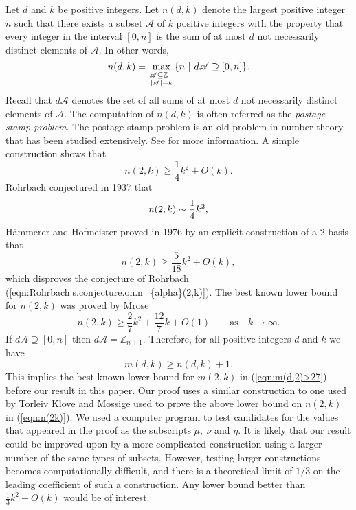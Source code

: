 \documentclass[11pt]{article}
\theoremstyle{definition}
\def\Z{\mbox{$\mathbb Z$}}
\begin{document}
 Let $d$ and $k$ be  positive integers. Let $n(d, k)$ denote the largest positive integer $n$ such that there exists a subset $\mathscr{A}$ of $k$ positive integers with the property that every integer in the interval $[0, n]$ is the sum of at most $d$ not necessarily distinct elements of $\mathscr{A}$. In other words, 
\[
n(d, k) = \max_{\scriptstyle \mathscr{A}\subseteq\mathbb Z^{+}\atop\scriptstyle |\mathscr{A}|=k}\{n\  |\ d \mathscr{A}\supseteq[0, n]\}.
\]
Recall that $d\mathscr A$ denotes the set of all sums of at most $d$ not necessarily distinct elements of $\mathscr A$. The computation of  $n(d, k)$ is often referred as the \emph{postage stamp problem}. The postage stamp problem is an old problem in number theory that has been studied extensively. See \cite{Hsu-Jia:CombinatorialNetworks,Selmer:1986a,Selmer:1986b} for more information. 
A simple construction shows that 
\[
n(2,k)\ge \frac14k^{2}+O(k).
\]
 Rohrbach \cite{Rohrbach:1937a} conjectured in 1937 that
\begin{equation}\label{eqn:Rohrbach's.conjecture.on.n_{alpha}(2,k)}
n(2,k)\sim\frac14{k^2},
\end{equation}
H\"ammerer and Hofmeister \cite{Hammerer-Hofmeister:1976} proved in
1976 by an explicit construction
of a $2$-basis that
\[
n(2,k)\ge \frac {5}{18}{k^2}+O(k),
\]
which disproves the conjecture of Rohrbach
(\ref{eqn:Rohrbach's.conjecture.on.n_{alpha}(2,k)}).
The  best known lower bound for $n(2,k)$ was proved by Mrose \cite{Mrose1979}
\begin{equation}\label{eqn:n(2k)}
n(2, k) \geq \frac{2}{7}k^2 + \frac{12}{7}k + O(1)\qquad  \text{as}\quad  k \to \infty.
\end{equation}
If  $d\mathscr{A}\supseteq[0, n]$ then  $d\mathscr{A}=\Z_{n+1}$. Therefore, for all positive integers $d$ and $k$ we have 
\[
m(d, k) \geq n(d, k)+1.
\]
This implies the best known lower bound for $m(2,k)$ in (\ref{eqn:m(d,2)>27}) before our result in this paper.
 Our proof uses a similar construction to one used by Torleiv Klove and Mossige used to prove the above lower bound on $n(2,k)$ in (\ref{eqn:n(2k)}).  We used a computer program to test candidates for the values that appeared in the proof as the subscripts $\mu,\ \nu$ and $\eta$.  It is likely that our result could be improved upon by a more complicated construction using a larger number of the same types of subsets.  However, testing larger constructions becomes computationally difficult, and there is a theoretical limit of $1/3$ on the leading coefficient of such a construction.  Any lower bound better than $\displaystyle\frac13k^2 + O(k)$ would be of interest.
\end{document}
